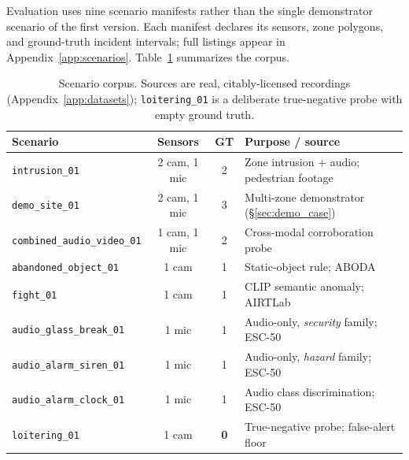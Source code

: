 Evaluation uses nine scenario manifests rather than the single demonstrator scenario of the first version. Each manifest declares its sensors, zone polygons, and ground-truth incident intervals; full listings appear in Appendix~\ref{app:scenarios}. Table~\ref{tab:corpus} summarizes the corpus.

\begin{table}[H]
	\centering
	\caption{Scenario corpus. Sources are real, citably-licensed recordings (Appendix~\ref{app:datasets}); \texttt{loitering\_01} is a deliberate true-negative probe with empty ground truth.}
	\label{tab:corpus}
	\small
	\begin{tabular}{lccp{5.2cm}}
		\toprule
		\textbf{Scenario}                   & \textbf{Sensors} & \textbf{GT} & \textbf{Purpose / source}                                         \\
		\midrule
		\texttt{intrusion\_01}              & 2 cam, 1 mic     & 2           & Zone intrusion + audio; pedestrian footage                        \\
		\texttt{demo\_site\_01}             & 2 cam, 1 mic     & 3           & Multi-zone demonstrator (\S\ref{sec:demo_case})                   \\
		\texttt{combined\_audio\_video\_01} & 1 cam, 1 mic     & 2           & Cross-modal corroboration probe                                   \\
		\texttt{abandoned\_object\_01}      & 1 cam            & 1           & Static-object rule; ABODA                                         \\
		\texttt{fight\_01}                  & 1 cam            & 1           & CLIP semantic anomaly; AIRTLab \cite{bianculli2020violence}       \\
		\texttt{audio\_glass\_break\_01}    & 1 mic            & 1           & Audio-only, \emph{security} family; ESC-50 \cite{piczak2015esc50} \\
		\texttt{audio\_alarm\_siren\_01}    & 1 mic            & 1           & Audio-only, \emph{hazard} family; ESC-50                          \\
		\texttt{audio\_alarm\_clock\_01}    & 1 mic            & 1           & Audio class discrimination; ESC-50                                \\
		\texttt{loitering\_01}              & 1 cam            & \textbf{0}  & True-negative probe; false-alert floor                            \\
		\bottomrule
	\end{tabular}
\end{table}

